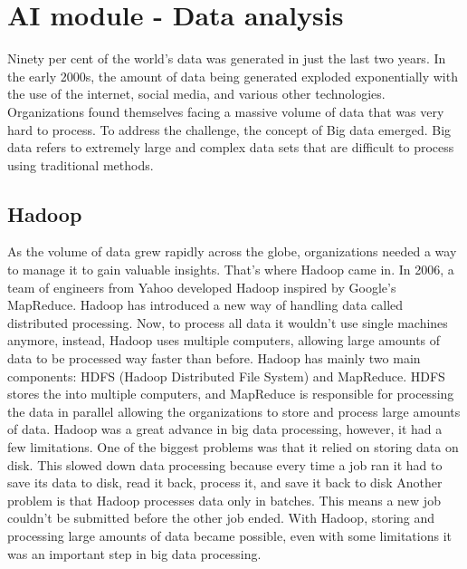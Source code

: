\section{AI module - Data analysis}
Ninety per cent of the world's data was generated in just the last two years. In the early 2000s, the amount of data being generated exploded exponentially with the use of the internet, social media, and various other technologies. Organizations found themselves facing a massive volume of data that was very hard to process. To address the challenge, the concept of Big data emerged. Big data refers to extremely large and complex data sets that are difficult to process using traditional methods. \cite{bigdata}

\subsection{Hadoop}
As the volume of data grew rapidly across the globe, organizations needed a way to manage it to gain valuable insights. That’s where Hadoop came in. In 2006, a team of engineers from Yahoo developed Hadoop inspired by Google’s MapReduce. Hadoop has introduced a new way of handling data called distributed processing. Now, to process all data it wouldn't use single machines anymore, instead, Hadoop uses multiple computers, allowing large amounts of data to be processed way faster than before.
Hadoop has mainly two main components: HDFS (Hadoop Distributed File System) and MapReduce. HDFS stores the into multiple computers, and MapReduce is responsible for processing the data in parallel allowing the organizations to store and process large amounts of data.
Hadoop was a great advance in big data processing, however, it had a few limitations. One of the biggest problems was that it relied on storing data on disk. This slowed down data processing because every time a job ran it had to save its data to disk, read it back, process it, and save it back to disk Another problem is that Hadoop processes data only in batches. This means a new job couldn't be submitted before the other job ended.
With Hadoop, storing and processing large amounts of data became possible, even with some limitations it was an important step in big data processing.\cite{hadoop}


